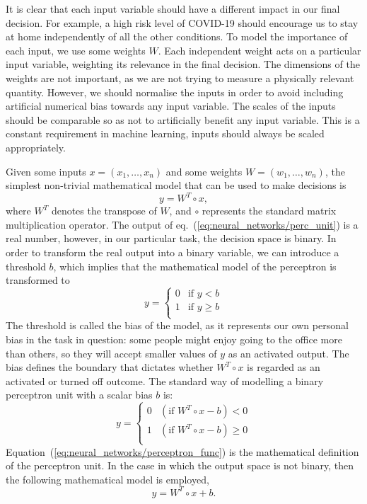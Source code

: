 It is clear that each input variable should have a different impact in our final decision. For example, a high
risk level of COVID-19 should encourage us to stay at home independently of all the other conditions. To model
the importance of each input, we use some weights $W$. Each independent weight acts on a particular input
variable, weighting its relevance in the final decision. The dimensions of the weights are not important, as
we are not trying to measure a physically relevant quantity. However, we should normalise the inputs in order
to avoid including artificial numerical bias towards any input variable. The scales of the inputs should be
comparable so as not to artificially benefit any input variable. This is a constant requirement in machine
learning, inputs should always be scaled appropriately.

Given some inputs $x = (x_1, \dots, x_n)$ and some weights $W = (w_1, \dots, w_n)$, the simplest non-trivial
mathematical model that can be used to make decisions is
\begin{equation}
    y = W^T \circ x,
    \label{eq:neural_networks/perc_unit}
\end{equation}
where $W^T$ denotes the transpose of $W$, and $\circ$ represents the standard matrix multiplication operator.
The output of eq.~(\ref{eq:neural_networks/perc_unit}) is a real number, however, in our particular task, the
decision space is binary. In order to transform the real output into a binary variable, we can introduce a
threshold $b$, which implies that the mathematical model of the perceptron is transformed to
\begin{equation}
    y = \left\{
	\begin{array}{ll}
		0  & \mbox{if } y < b \\
		1  & \mbox{if } y \geq b \\
	\end{array} \right.\label{eq:neural_networks/threshold}
\end{equation}
The threshold is called the bias of the model, as it represents our own personal bias in the task in question:
some people might enjoy going to the office more than others, so they will accept smaller values of $y$ as an
activated output. The bias defines the boundary that dictates whether $W^T \circ x$ is regarded as an
activated or turned off outcome. The standard way of modelling a binary perceptron unit with a scalar bias $b$
is:
\begin{equation}
    y = \left\{
        \begin{array}{ll}
            0  & (\mbox{if } W^T \circ x - b) < 0 \\
		    1  & (\mbox{if } W^T \circ x - b) \geq 0 \\
	    \end{array} \right.\label{eq:neural_networks/perceptron_func}
\end{equation}
Equation~(\ref{eq:neural_networks/perceptron_func}) is the mathematical definition of the perceptron unit. In
the case in which the output space is not binary, then the following mathematical model is employed,
\begin{equation}
    y = W^T \circ x + b.
    \label{eq:neural_networks/perceptron}
\end{equation}

